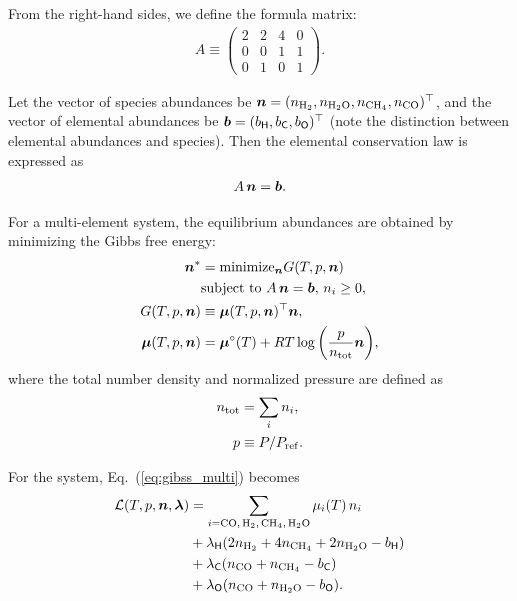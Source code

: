 From the right-hand sides, we define the formula matrix:
\begin{align*}
  A \equiv
\begin{pmatrix} 
2 & 2 & 4 & 0 \\
0 & 0 & 1 & 1 \\
0 & 1 & 0 & 1 
\end{pmatrix}.
\end{align*}

Let the vector of species abundances be $\boldsymbol{n} = (n_\mathrm{H_2}, n_\mathrm{H_2 O},n_\mathrm{CH_4},n_\mathrm{CO})^\top$, and the vector of elemental abundances be $\boldsymbol{b} = (b_{\mathsf{H}}, b_{\mathsf{C}}, b_{\mathsf{O}})^\top$ (note the distinction between elemental abundances and species). Then the elemental conservation law is expressed as
\begin{align}
    A \, \boldsymbol{n} = \boldsymbol{b}.
\end{align}

For a multi-element system, the equilibrium abundances are obtained by minimizing the Gibbs free energy:
\begin{align}
\label{eq:gibss_multi}
    \boldsymbol{n}^\ast &= \mathrm{minimize}_{\boldsymbol{n}} G(T, p, \boldsymbol{n}) \nonumber \\
    &\mbox{subject to} \,\, A \, \boldsymbol{n} = \boldsymbol{b}, \, n_i \ge 0, \\
    G(T, p, \boldsymbol{n}) &\equiv  \boldsymbol{\mu} (T, p, \boldsymbol{n})^\top \boldsymbol{n}, \\ 
    \label{eq:chemical_potential_mu}
    \boldsymbol{\mu} (T, p, \boldsymbol{n}) &=  \boldsymbol{\mu}^\circ(T) + RT \log{\left(\frac{p}{n_\mathrm{tot}} \boldsymbol{n}\right)} ,
\end{align}
where the total number density and normalized pressure are defined as
\begin{align}
\label{eq:ntot_tce}
    n_\mathrm{tot} &= \sum_i n_i, \\
    p &\equiv P/P_\mathrm{ref}.
\end{align}

For the  system, Eq.~(\ref{eq:gibss_multi}) becomes
\begin{align}
    \mathcal{L}(T, p, \nv,\lambdav) &= \sum_{i = \ce{CO, H2, CH4, H2O}} \mu_i (T) \, n_i \nonumber \\ 
    &+ \lambda_{\Hel} (2 n_{\ce{H2}} + 4 n_{\ce{CH4}} + 2 n_{\ce{H2O}} - b_\Hel) \nonumber \\
    &+ \lambda_{\Cel} (n_{\ce{CO}} + n_{\ce{CH4}} - b_\Cel) \nonumber \\ 
    &+ \lambda_{\Oel} (n_{\ce{CO}} + n_{\ce{H2O}} - b_\Oel).
\end{align}

